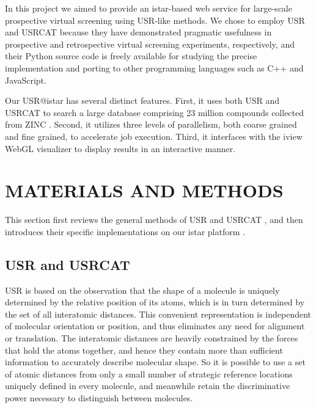 \documentclass[a4,center,fleqn]{NAR}
\begin{document}
In this project we aimed to provide an istar-based \cite{1362} web service for large-scale prospective virtual screening using USR-like methods. We chose to employ USR \cite{1379} and USRCAT \cite{1331} because they have demonstrated pragmatic usefulness in prospective \cite{1380,1281,1504,1502,1615} and retrospective \cite{1331} virtual screening experiments, respectively, and their Python source code is freely available for studying the precise implementation and porting to other programming languages such as C++ and JavaScript.

Our USR@istar has several distinct features. First, it uses both USR and USRCAT to search a large database comprising 23 million compounds collected from ZINC \cite{532,1178}. Second, it utilizes three levels of parallelism, both coarse grained and fine grained, to accelerate job execution. Third, it interfaces with the iview \cite{1366} WebGL visualizer to display results in an interactive manner.

\section{MATERIALS AND METHODS}

This section first reviews the general methods of USR \cite{1379} and USRCAT \cite{1331}, and then introduces their specific implementations on our istar platform \cite{1362}.

\subsection{USR and USRCAT}

USR is based on the observation that the shape of a molecule is uniquely determined by the relative position of its atoms, which is in turn determined by the set of all interatomic distances. This convenient representation is independent of molecular orientation or position, and thus eliminates any need for alignment or translation. The interatomic distances are heavily constrained by the forces that hold the atoms together, and hence they contain more than sufficient information to accurately describe molecular shape. So it is possible to use a set of atomic distances from only a small number of strategic reference locations uniquely defined in every molecule, and meanwhile retain the discriminative power necessary to distinguish between molecules.
\end{document}

